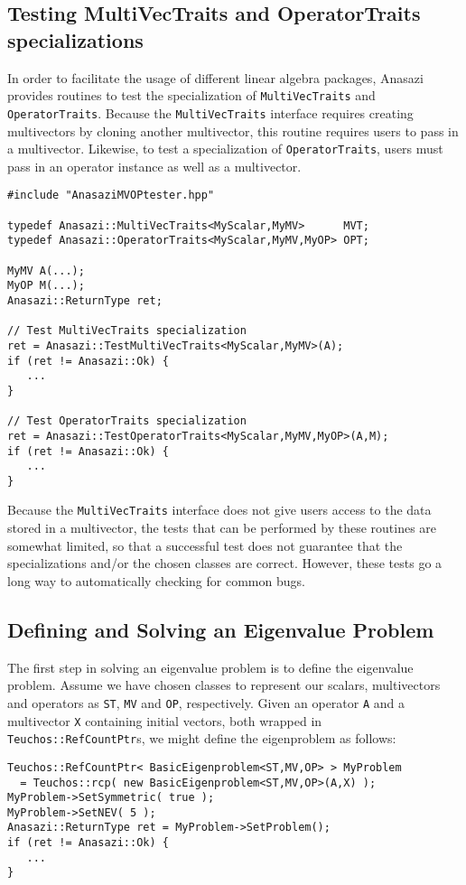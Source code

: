 \subsection{Testing MultiVecTraits and OperatorTraits specializations}
\label{sec:anasazi:MVOPtester}

In order to facilitate the usage of different linear algebra packages, Anasazi
provides routines to test the specialization of \verb!MultiVecTraits! and
\verb!OperatorTraits!. Because the \verb!MultiVecTraits! interface requires
creating multivectors by cloning another multivector, this routine requires 
users to pass in a multivector. Likewise, to test a specialization of
\verb!OperatorTraits!, users must pass in an operator instance as well as a
multivector.
\begin{verbatim}
#include "AnasaziMVOPtester.hpp"

typedef Anasazi::MultiVecTraits<MyScalar,MyMV>      MVT;
typedef Anasazi::OperatorTraits<MyScalar,MyMV,MyOP> OPT;

MyMV A(...);
MyOP M(...);
Anasazi::ReturnType ret;

// Test MultiVecTraits specialization
ret = Anasazi::TestMultiVecTraits<MyScalar,MyMV>(A);
if (ret != Anasazi::Ok) {
   ...
}

// Test OperatorTraits specialization
ret = Anasazi::TestOperatorTraits<MyScalar,MyMV,MyOP>(A,M);
if (ret != Anasazi::Ok) {
   ...
}
\end{verbatim}

Because the \verb!MultiVecTraits! interface does not give users access to the
data stored in a multivector, the tests that can be performed by these routines
are somewhat limited, so that a successful test does not guarantee that the
specializations and/or the chosen classes are correct. However, these tests go a
long way to automatically checking for common bugs.

\subsection{Defining and Solving an Eigenvalue Problem}
\label{sec:anasazi:example}

The first step in solving an eigenvalue problem is to define the eigenvalue
problem. Assume we have chosen classes to represent our scalars, multivectors
and operators as \verb!ST!, \verb!MV! and \verb!OP!, respectively. Given an
operator \verb!A! and a multivector \verb!X! containing initial vectors, both
wrapped in \verb!Teuchos::RefCountPtr!s, we might define the eigenproblem as
follows:
\begin{verbatim}
Teuchos::RefCountPtr< BasicEigenproblem<ST,MV,OP> > MyProblem 
  = Teuchos::rcp( new BasicEigenproblem<ST,MV,OP>(A,X) );
MyProblem->SetSymmetric( true );
MyProblem->SetNEV( 5 );
Anasazi::ReturnType ret = MyProblem->SetProblem();
if (ret != Anasazi::Ok) {
   ...
}
\end{verbatim}

